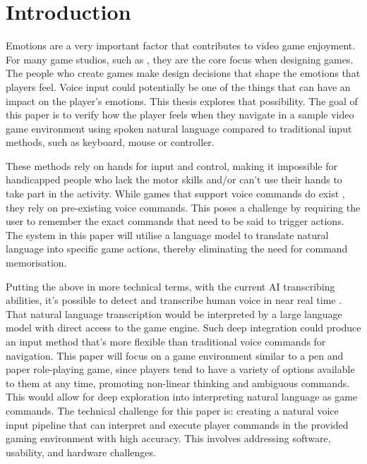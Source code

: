 \chapter{Introduction}

\label{ch:introduction}





Emotions are a very important factor that contributes to video game enjoyment. 
For many game studios, such as \textcite{11BitStudios2026}, they are the core focus when designing games.
The people who create games make design decisions that shape the emotions that players feel.
Voice input could potentially be one of the things that can have an impact on the player's emotions. 
This thesis explores that possibility.
The goal of this paper is to verify how the player feels when they navigate in a sample video game environment using spoken natural language compared to traditional input methods, such as keyboard, mouse or controller.  

These methods rely on hands for input and control, making it impossible for handicapped people who lack the motor skills and/or can't use their hands to take part in the activity. While games that support voice commands do exist \parencite{iridiumstudiosThereCameEcho2015}, they rely on pre-existing voice commands. This poses a challenge by requiring the user to remember the exact commands that need to be said to trigger actions. The system in this paper will utilise a language model to translate natural language into specific game actions, thereby eliminating the need for command memorisation. 


Putting the above in more technical terms, with the current AI transcribing abilities, it's possible to detect and transcribe human voice in near real time \parencite{OpenAIWhisper2022}. That natural language transcription would be interpreted by a large language model \parencite{LargeLanguageModel2025} with direct access to the game engine. Such deep integration could produce an input method that’s more flexible than traditional voice commands for navigation. 
This paper will focus on a game environment similar to a pen and paper role-playing game\parencite{RPG2025}, since players tend to have a variety of options available to them at any time, promoting non-linear thinking and ambiguous commands.
This would allow for deep exploration into interpreting natural language as game commands. 
The technical challenge for this paper is: creating a natural voice input pipeline that can interpret and execute player commands in the provided gaming environment with high accuracy. This involves addressing software, usability, and hardware challenges. 





